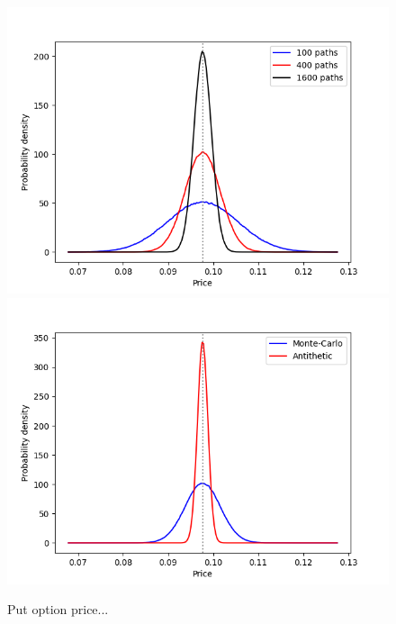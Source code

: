\begin{figure}
\centering
\includegraphics[scale=0.7]{figures/hw_1f_put_option/density_2d_Put_False.png}
\includegraphics[scale=0.7]{figures/hw_1f_put_option/density_2d_Put_400.png}
\caption{Put option price...}
\end{figure}


